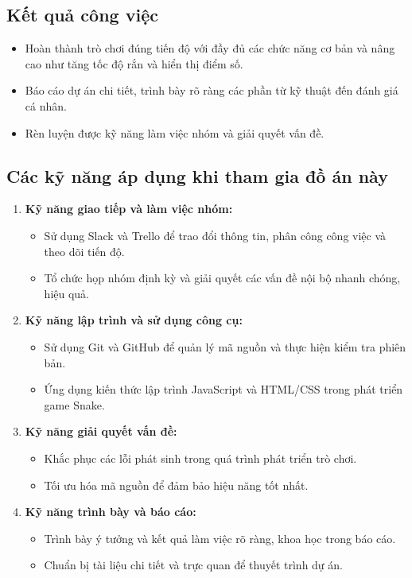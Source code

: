 \documentclass[a4paper, 12pt]{article}
\begin{document}
\subsection{Kết quả công việc}
\begin{itemize}
    \item Hoàn thành trò chơi đúng tiến độ với đầy đủ các chức năng cơ bản và nâng cao như tăng tốc độ rắn và hiển thị điểm số.
    \item Báo cáo dự án chi tiết, trình bày rõ ràng các phần từ kỹ thuật đến đánh giá cá nhân.
    \item Rèn luyện được kỹ năng làm việc nhóm và giải quyết vấn đề.
\end{itemize}

\newpage
\subsection{Các kỹ năng áp dụng khi tham gia đồ án này}
\begin{enumerate}
    \item \textbf{Kỹ năng giao tiếp và làm việc nhóm:}
    \begin{itemize}
        \item Sử dụng Slack và Trello để trao đổi thông tin, phân công công việc và theo dõi tiến độ.
        \item Tổ chức họp nhóm định kỳ và giải quyết các vấn đề nội bộ nhanh chóng, hiệu quả.
    \end{itemize}
    
    \item \textbf{Kỹ năng lập trình và sử dụng công cụ:}
    \begin{itemize}
        \item Sử dụng Git và GitHub để quản lý mã nguồn và thực hiện kiểm tra phiên bản.
        \item Ứng dụng kiến thức lập trình JavaScript và HTML/CSS trong phát triển game Snake.
    \end{itemize}
    
    \item \textbf{Kỹ năng giải quyết vấn đề:}
    \begin{itemize}
        \item Khắc phục các lỗi phát sinh trong quá trình phát triển trò chơi.
        \item Tối ưu hóa mã nguồn để đảm bảo hiệu năng tốt nhất.
    \end{itemize}
    
    \item \textbf{Kỹ năng trình bày và báo cáo:}
    \begin{itemize}
        \item Trình bày ý tưởng và kết quả làm việc rõ ràng, khoa học trong báo cáo.
        \item Chuẩn bị tài liệu chi tiết và trực quan để thuyết trình dự án.
    \end{itemize}
\end{enumerate}
\end{document}
